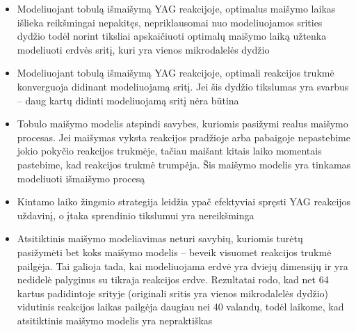 \begin{itemize}
    
    \item Modeliuojant tobulą išmaišymą YAG reakcijoje, optimalus maišymo laikas išlieka reikšmingai nepakitęs, nepriklausomai nuo modeliuojamos srities dydžio todėl norint tiksliai apskaičiuoti optimalų maišymo laiką užtenka modeliuoti erdvės sritį, kuri yra vienos mikrodalelės dydžio

    \item Modeliuojant tobulą išmaišymą YAG reakcijoje, optimali reakcijos trukmė konverguoja didinant modeliuojamą sritį. Jei šis dydžio tikslumas yra svarbus -- daug kartų didinti modeliuojamą sritį nėra būtina

    \item Tobulo maišymo modelis atspindi savybes, kuriomis pasižymi realus maišymo procesas. Jei maišymas vyksta reakcijos pradžioje arba pabaigoje nepastebime jokio pokyčio reakcijos trukmėje, tačiau maišant kitais laiko momentais pastebime, kad reakcijos trukmė trumpėja. Šis maišymo modelis yra tinkamas modeliuoti išmaišymo procesą

    \item Kintamo laiko žingsnio strategija leidžia ypač efektyviai spręsti YAG reakcijos uždavinį, o įtaka sprendinio tikslumui yra nereikšminga

    \item Atsitiktinis maišymo modeliavimas neturi savybių, kuriomis turėtų pasižymėti bet koks maišymo modelis -- beveik visuomet reakcijos trukmė pailgėja. Tai galioja tada, kai modeliuojama erdvė yra dviejų dimensijų ir yra nedidelė palyginus su tikraja reakcijos erdve. Rezultatai rodo, kad net 64 kartus padidintoje srityje (originali sritis yra vienos mikrodalelės dydžio) vidutinis reakcijos laikas pailgėja daugiau nei 40 valandų, todėl laikome, kad atsitiktinis maišymo modelis yra nepraktiškas

\end{itemize}